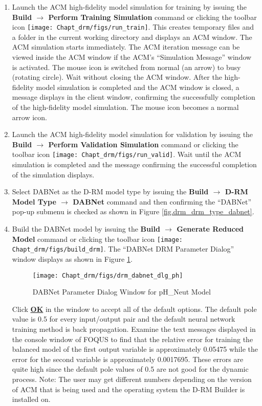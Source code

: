 \begin{enumerate}
	\item Launch the ACM high-fidelity model simulation for training by issuing the \textbf{Build $\rightarrow$ Perform Training Simulation} command or clicking the toolbar icon \texttt{[image: Chapt\_drm/figs/run\_train]}.  This creates temporary files and a folder in the current working directory and displays an ACM window.  The ACM simulation starts immediately.  The ACM iteration message can be viewed inside the ACM window if the ACM’s ``Simulation Message'' window is activated.  The mouse icon is switched from normal (an arrow) to busy (rotating circle).  Wait without closing the ACM window.  After the high-fidelity model simulation is completed and the ACM window is closed, a message displays in the client window, confirming the successfully completion of the high-fidelity model simulation.  The mouse icon becomes a normal arrow icon.
	\item Launch the ACM high-fidelity model simulation for validation by issuing the \textbf{Build $\rightarrow$ Perform Validation Simulation} command or clicking the toolbar icon \texttt{[image: Chapt\_drm/figs/run\_valid]}.  Wait until the ACM simulation is completed and the message confirming the successful completion of the simulation displays.
	\item Select DABNet as the D-RM model type by issuing the \textbf{Build $\rightarrow$ D-RM Model Type $\rightarrow$ DABNet} command and then confirming the ``DABNet'' pop-up submenu is checked as shown in Figure \ref{fig.drm_drm_type_dabnet}.
	\item Build the DABNet model by issuing the \textbf{Build $\rightarrow$ Generate Reduced Model} command or clicking the toolbar icon \texttt{[image: Chapt\_drm/figs/build\_drm]}.  The ``DABNet DRM Parameter Dialog'' window displays as shown in Figure \ref{fig.drm_dabnet_dlg_ph}.  
	\begin{figure}[H]
		\begin{center}
			\texttt{[image: Chapt\_drm/figs/drm\_dabnet\_dlg\_ph]}
			\caption{DABNet Parameter Dialog Window for pH\_Neut Model}
			\label{fig.drm_dabnet_dlg_ph}
		\end{center}
	\end{figure}
	Click \textbf{\underline{OK}} in the window to accept all of the default options.  The default pole value is 0.5 for every input/output pair and the default neural network training method is back propagation.  Examine the text messages displayed in the console window of FOQUS to find that the relative error for training the balanced model of the first output variable is approximately 0.05475 while the error for the second variable is approximately 0.0017695.  These errors are quite high since the default pole values of 0.5 are not good for the dynamic process.  Note: The user may get different numbers depending on the version of ACM that is being used and the operating system the D-RM Builder is installed on.

\end{enumerate}
